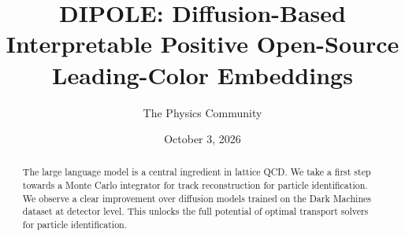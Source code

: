 \documentclass[11pt]{article}
\title{DIPOLE: Diffusion-Based Interpretable Positive Open-Source Leading-Color Embeddings}
\author{The Physics Community}
\date{October 3, 2026}
\begin{document}
\maketitle
\begin{abstract}
The large language model is a central ingredient in lattice QCD. We take
a first step towards a Monte Carlo integrator for track reconstruction
for particle identification. We observe a clear improvement over
diffusion models trained on the Dark Machines dataset at detector level.
This unlocks the full potential of optimal transport solvers for
particle identification.
\end{abstract}
\tableofcontents



\nocite{*}


\end{document}
